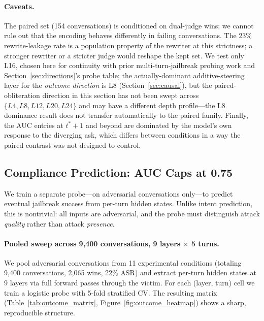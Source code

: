 \documentclass[11pt]{article}
\begin{document}
\paragraph{Caveats.}
The paired set (154 conversations) is conditioned on dual-judge wins; we cannot rule out that the encoding behaves differently in failing conversations.
The 23\% rewrite-leakage rate is a population property of the rewriter at this strictness; a stronger rewriter or a stricter judge would reshape the kept set.
We test only L16, chosen here for continuity with prior multi-turn-jailbreak probing work and Section~\ref{sec:directions}'s probe table; the actually-dominant additive-steering layer for the \emph{outcome direction} is L8 (Section~\ref{sec:causal}), but the paired-obliteration direction in this section has not been swept across $\{L4, L8, L12, L20, L24\}$ and may have a different depth profile---the L8 dominance result does not transfer automatically to the paired family.
Finally, the AUC entries at $t^* + 1$ and beyond are dominated by the model's own response to the diverging ask, which differs between conditions in a way the paired contrast was not designed to control.

\subsection{Compliance Prediction: AUC Caps at 0.75}
\label{sec:outcome}

We train a separate probe---on adversarial conversations only---to predict eventual jailbreak success from per-turn hidden states.
Unlike intent prediction, this is nontrivial: all inputs are adversarial, and the probe must distinguish attack \emph{quality} rather than attack \emph{presence}.

\paragraph{Pooled sweep across 9{,}400 conversations, 9 layers $\times$ 5 turns.}
We pool adversarial conversations from 11 experimental conditions (totaling 9{,}400 conversations, 2{,}065 wins, 22\% ASR) and extract per-turn hidden states at 9 layers via full forward passes through the victim.
For each (layer, turn) cell we train a logistic probe with 5-fold stratified CV.
The resulting matrix (Table~\ref{tab:outcome_matrix}, Figure~\ref{fig:outcome_heatmap}) shows a sharp, reproducible structure.
\end{document}
